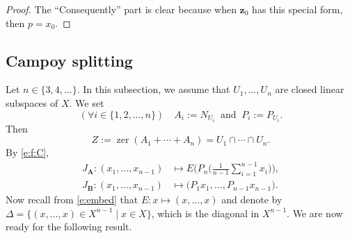 \documentclass[11pt]{article}
\newcommand{\bz}{\ensuremath{\mathbf{z}}}
\newcommand{\zer}{\ensuremath{\operatorname{zer}}}
\newcommand{\bA}{\ensuremath{{\mathbf{A}}}}
\newcommand{\bB}{\ensuremath{{\mathbf{B}}}}
\theoremstyle{definition}
\providecommand{\zer}{\operatorname{zer}}
\begin{document}
{\begin{proof}
The ``Consequently'' part is clear because when 
$\bz_0$ has this special form, then $p=x_0$. 
\end{proof}


\subsection{Campoy splitting}

\label{ss:Clin}



Let $n\in\{3,4,\ldots\}$. 
In this subsection, we assume that 
$U_1,\ldots,U_n$ are closed linear subspaces of $X$.
We set
\begin{equation*}
(\forall i\in\{1,2,\ldots,n\})
\quad 
A_i := N_{U_i} \;\;\text{and}\;\;
P_i := P_{U_i}. 
\end{equation*}
Then
\begin{equation*}
Z := \zer(A_1+\cdots+A_n) = U_1\cap \cdots \cap U_n.
\end{equation*}
By \cref{e:f:C}, 
\begin{subequations}
\begin{align}
J_{\bA}\colon (x_1,\ldots,x_{n-1})&\mapsto E\bigg(P_n\Big(
\tfrac{1}{n-1}\sum_{i=1}^{n-1}x_i\Big)\bigg)\label{e:211012b},\\
J_{\bB} \colon (x_1,\ldots,x_{n-1})&\mapsto 
\big(P_{1}x_1,\ldots,P_{n-1}x_{n-1} \big). \label{e:211012d}
\end{align}
\end{subequations}
Now recall from \cref{e:embed} that $E:x\mapsto (x,\dots,x)$ and denote 
by $\Delta=\{(x,\dots,x)\in X^{n-1}\mid x\in X\}$, which is the diagonal in $X^{n-1}$. 
We are now ready for the following result. 

}
\end{document}
